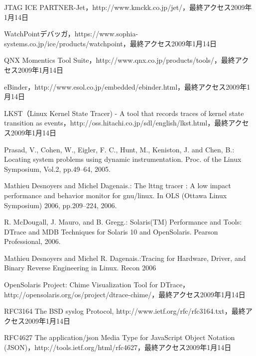 \begin{thebibliography}{99}
JTAG ICE PARTNER-Jet，http://www.kmckk.co.jp/jet/，最終アクセス2009年1月14日

WatchPointデバッガ，https://www.sophia-systems.co.jp/ice/products/watchpoint，最終アクセス2009年1月14日

QNX Momentics Tool Suite，http://www.qnx.co.jp/products/tools/，最終アクセス2009年1月14日

eBinder，http://www.esol.co.jp/embedded/ebinder.html，最終アクセス2009年1月14日

LKST（Linux Kernel State Tracer) - A tool that records
traces of kernel state transition as events，http://oss.hitachi.co.jp/sdl/english/lkst.html，最終アクセス2009年1月14日

Prasad, V., Cohen, W., Eigler, F. C., Hunt, M., Keniston, J. and Chen, B.: Locating system problems using dynamic instrumentation. Proc. of the Linux Symposium, Vol.2, pp.49–64, 2005.

Mathieu Desnoyers and Michel Dagenais.: The lttng tracer : A low impact performance and behavior monitor for gnu/linux. In OLS (Ottawa Linux Symposium) 2006, pp.209–224, 2006.

R. McDougall, J. Mauro, and B. Gregg.: Solaris(TM) Performance and Tools: DTrace and MDB Techniques for Solaris 10 and OpenSolaris. Pearson Professional, 2006.

Mathieu Desnoyers and Michel R. Dagenais.:Tracing for Hardware, Driver, and Binary Reverse Engineering in Linux. Recon 2006

OpenSolaris Project: Chime Visualization Tool for DTrace，http://opensolaris.org/os/project/dtrace-chime/，最終アクセス2009年1月14日

RFC3164 The BSD syslog Protocol, http://www.ietf.org/rfc/rfc3164.txt，最終アクセス2009年1月14日

RFC4627 The application/json Media Type for JavaScript Object Notation (JSON)，http://tools.ietf.org/html/rfc4627，最終アクセス2009年1月14日
\end{thebibliography}
